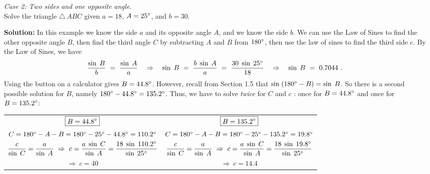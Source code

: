 \begin{exmp}\label{exmp:case2}
\noindent \emph{Case 2: Two sides and one opposite angle.}\\Solve the triangle $\triangle\,ABC$ given
 $a = 18$, $A = 25^\circ$, and $b = 30$.\vspace{1mm}
 \par\noindent\textbf{Solution:} In this example we know the side $a$ and its opposite angle $A$,
 and we know the side $b$. We can use the Law of Sines to find the other opposite angle $B$,
 then find the third angle $C$ by subtracting $A$ and $B$ from $180^\circ$, then use the law
 of sines to find the third side $c$. By the Law of Sines, we have
 \begin{displaymath}
  \frac{\sin\;B}{b} ~=~ \frac{\sin\;A}{a} \quad\Rightarrow\quad \sin\;B ~=~ \frac{b\;\sin\;A}{a} ~=~
   \frac{30\;\sin\;25^\circ}{18} \quad\Rightarrow\quad \sin\;B ~=~ 0.7044 ~.
 \end{displaymath}
 Using the {\setlength\fboxsep{1pt}} button on a calculator
 gives $B = 44.8^\circ$. However, recall
 from Section 1.5 that $\sin\;(180^\circ - B) = \sin\;B$. So there is a second possible solution
 for $B$, namely $180^\circ - 44.8^\circ = 135.2^\circ$. Thus, we have to solve \emph{twice}
 for $C$ and $c$ : once for $B = 44.8^\circ$ and once for $B = 135.2^\circ$:\vspace{2mm}

\begin{tabular}{c|c}
 $\boxed{B = 44.8^\circ}$ & $\boxed{B = 135.2^\circ}$\\[4pt]
 $C = 180^\circ - A - B = 180^\circ - 25^\circ - 44.8^\circ = 110.2^\circ$ &
 $C = 180^\circ - A - B = 180^\circ - 25^\circ - 135.2^\circ = 19.8^\circ$\\[4pt]
 $\dfrac{c}{\sin\;C} = \dfrac{a}{\sin\;A} ~\Rightarrow~ c = \dfrac{a\;\sin\;C}{\sin\;A}
  = \dfrac{18\;\sin\;110.2^\circ}{\sin\;25^\circ}$ &
 $\dfrac{c}{\sin\;C} = \dfrac{a}{\sin\;A} ~\Rightarrow~ c = \dfrac{a\;\sin\;C}{\sin\;A}
  = \dfrac{18\;\sin\;19.8^\circ}{\sin\;25^\circ}$\\[8pt]
 $\Rightarrow~ c = 40$ & $\Rightarrow~ c = 14.4$
\end{tabular}


\end{exmp}
